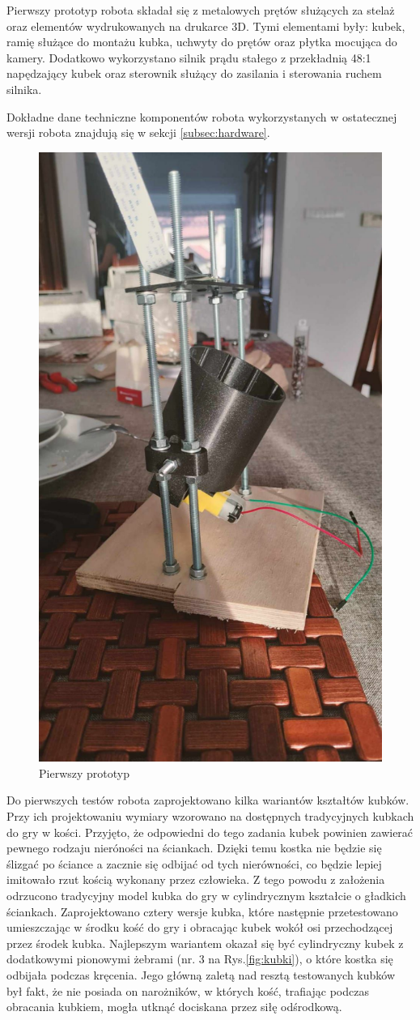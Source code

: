Pierwszy prototyp robota składał się z metalowych prętów służących za stelaż oraz elementów wydrukowanych na drukarce 3D.
Tymi elementami były: kubek, ramię służące do montażu kubka, uchwyty do prętów oraz płytka mocująca do kamery. Dodatkowo
wykorzystano silnik prądu stałego z przekładnią 48:1 napędzający kubek oraz sterownik służący do zasilania i sterowania ruchem silnika. \cite{wheel} \cite{L298}

Dokładne dane techniczne komponentów robota wykorzystanych w ostatecznej wersji robota znajdują się w sekcji \ref{subsec:hardware}.

\begin{figure}[H]
    \centering
    \includegraphics[width=0.25\linewidth, trim={35mm 75mm 35mm 30mm}, clip]{chapters/03-praca-wlasna/figures/pierwszy}
    \caption{\label{fig:pierwszy}Pierwszy prototyp}
\end{figure}

Do pierwszych testów robota zaprojektowano kilka wariantów kształtów kubków. Przy ich projektowaniu wymiary wzorowano na dostępnych tradycyjnych kubkach do gry w kości.
Przyjęto, że odpowiedni do tego zadania kubek powinien
zawierać pewnego rodzaju nieróności na ściankach. Dzięki temu kostka nie będzie się ślizgać po ściance a zacznie się odbijać od tych nierówności, co 
będzie lepiej imitowało rzut kością wykonany przez człowieka. Z tego powodu z założenia odrzucono tradycyjny model kubka do gry w cylindrycznym kształcie 
o gładkich ściankach. Zaprojektowano cztery wersje kubka, które następnie przetestowano umieszczając w środku kość do gry i obracając kubek wokół osi przechodzącej przez środek kubka.
Najlepszym wariantem okazał się być cylindryczny kubek z dodatkowymi pionowymi żebrami (nr. 3 na Rys.\ref{fig:kubki}), o które kostka się odbijała podczas kręcenia. Jego główną zaletą
nad resztą testowanych kubków był fakt, że nie posiada on narożników, w których kość, trafiając podczas obracania kubkiem, mogła utknąć dociskana przez 
siłę odśrodkową.

